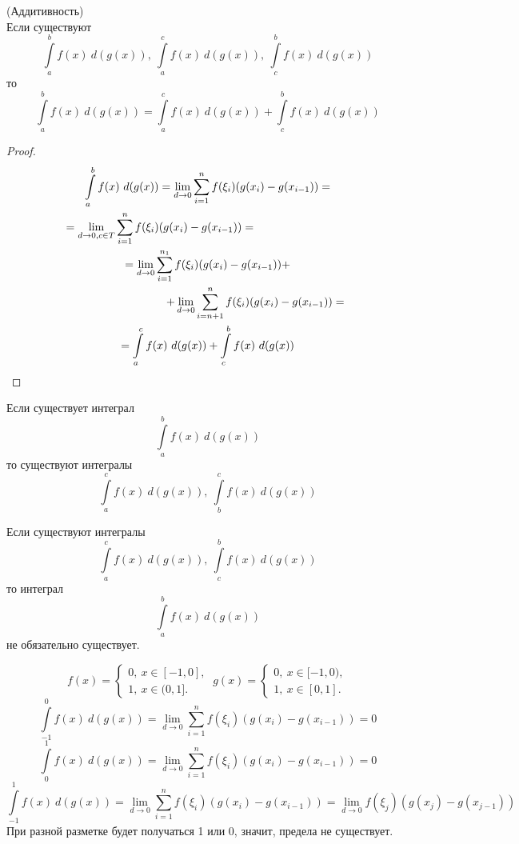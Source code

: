 \begin{numtheorem}
    (Аддитивность)\\
    Если существуют 
    \[\int\limits_{a}^{b}f(x)\ d(g(x)),\ \int\limits_{a}^{c}f(x)\ d(g(x)),\ \int\limits_{c}^{b}f(x)\ d(g(x))\]
    то 
    \[\int\limits_{a}^{b}f(x)\ d(g(x))=\int\limits_{a}^{c}f(x)\ d(g(x)) + \int\limits_{c}^{b}f(x)\ d(g(x))\]
\end{numtheorem} 
\begin{proof}
\begin{multline*}
    \int\limits_{a}^{b}f(x)\ d(g(x))=\lim\limits_{d\to 0} \sum\limits_{i=1}^{n}f(\xi_i)(g(x_i)-g(x_{i-1}))=\\
    =\lim\limits_{d\to 0, c\in T}\sum\limits_{i=1}^{n}f(\xi_i)(g(x_i)-g(x_{i-1}))=\tab[3cm]\\
    =\lim\limits_{d\to 0}\sum\limits_{i=1}^{n_1}f(\xi_i)(g(x_i)-g(x_{i-1}))+\\
    \tab[3cm]+\lim\limits_{d\to 0}\sum\limits_{i=n+1}^{n}f(\xi_i)(g(x_i)-g(x_{i-1}))=\\=\int\limits_{a}^{c}f(x)\ d(g(x)) + \int\limits_{c}^{b}f(x)\ d(g(x))
\end{multline*}
\end{proof} 
\begin{comm}
    Если существует интеграл
    \[\int\limits_{a}^{b}f(x)\ d(g(x))\]
    то существуют интегралы
    \[\int\limits_{a}^{c}f(x)\ d(g(x)),\ \int\limits_{b}^{c}f(x)\ d(g(x))\]
\end{comm} 
\begin{comm}
    Если существуют интегралы
    \[\int\limits_{a}^{c}f(x)\ d(g(x)),\ \int\limits_{c}^{b}f(x)\ d(g(x))\]
    то интеграл
    \[\int\limits_{a}^{b}f(x)\ d(g(x))\]
    не обязательно существует.
\end{comm} 
\begin{example}
    \[f(x)=\begin{cases}
        0,\ x\in [-1,0],\\
        1,\ x\in (0, 1].
    \end{cases}\
        g(x)=\begin{cases}
            0,\ x\in [-1,0),\\
            1,\ x\in [0, 1].
    \end{cases}
    \]
    \[\int\limits_{-1}^{0}f(x)\ d(g(x))=\lim\limits_{d\to 0}\sum\limits_{i=1}^{n}f(\xi_i)(g(x_{i})-g(x_{i-1}))=0\]
    \[\int\limits_{0}^{1}f(x)\ d(g(x))=\lim\limits_{d\to 0}\sum\limits_{i=1}^{n}f(\xi_i)(g(x_{i})-g(x_{i-1}))=0\]
    \[\int\limits_{-1}^{1}f(x)\ d(g(x))=\lim\limits_{d\to 0}\sum\limits_{i=1}^{n}f(\xi_i)(g(x_{i})-g(x_{i-1}))=\lim\limits_{d\to 0} f(\xi_j)(g(x_j)-g(x_{j-1}))\]
    При разной разметке будет получаться 1 или 0, значит, предела не существует.
\end{example}

